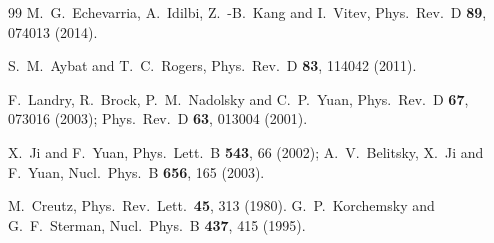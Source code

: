 \documentclass[aps,prd,preprint,tightenlines,superscriptaddress,nofootinbib]{revtex4}
\begin{document}
\begin{thebibliography}{99}
  M.~G.~Echevarria, A.~Idilbi, Z.~-B.~Kang and I.~Vitev,
  Phys.\ Rev.\ D {\bf 89}, 074013 (2014).
  


  S.~M.~Aybat and T.~C.~Rogers,
  Phys.\ Rev.\ D {\bf 83}, 114042 (2011).


  F.~Landry, R.~Brock, P.~M.~Nadolsky and C.~P.~Yuan,
  Phys.\ Rev.\ D {\bf 67}, 073016 (2003);
  Phys.\ Rev.\ D {\bf 63}, 013004 (2001).
  
  


  X.~Ji and F.~Yuan,
  Phys.\ Lett.\ B {\bf 543}, 66 (2002);
  A.~V.~Belitsky, X.~Ji and F.~Yuan,
  Nucl.\ Phys.\ B {\bf 656}, 165 (2003).
  
  M.~Creutz,
  Phys.\ Rev.\ Lett.\  {\bf 45}, 313 (1980).
  G.~P.~Korchemsky and G.~F.~Sterman,
  Nucl.\ Phys.\ B {\bf 437}, 415 (1995).
  
  
  
\end{thebibliography}
\end{document}
